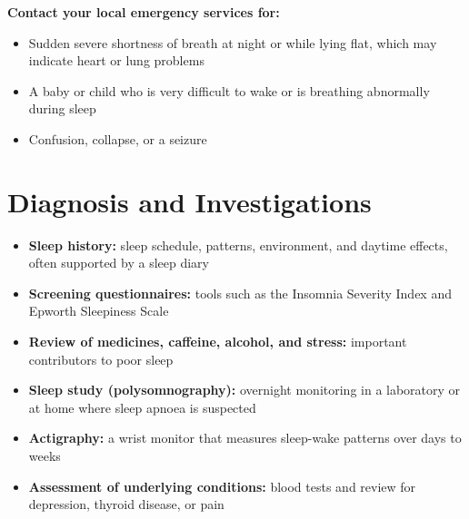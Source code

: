\textbf{Contact your local emergency services for:}
\begin{itemize}
    \item Sudden severe shortness of breath at night or while lying flat, which may indicate heart or lung problems
    \item A baby or child who is very difficult to wake or is breathing abnormally during sleep
    \item Confusion, collapse, or a seizure
\end{itemize}

\section*{Diagnosis and Investigations}
\begin{itemize}
    \item \textbf{Sleep history:} sleep schedule, patterns, environment, and daytime effects, often supported by a sleep diary
    \item \textbf{Screening questionnaires:} tools such as the Insomnia Severity Index and Epworth Sleepiness Scale
    \item \textbf{Review of medicines, caffeine, alcohol, and stress:} important contributors to poor sleep
    \item \textbf{Sleep study (polysomnography):} overnight monitoring in a laboratory or at home where sleep apnoea is suspected
    \item \textbf{Actigraphy:} a wrist monitor that measures sleep-wake patterns over days to weeks
    \item \textbf{Assessment of underlying conditions:} blood tests and review for depression, thyroid disease, or pain
\end{itemize}

